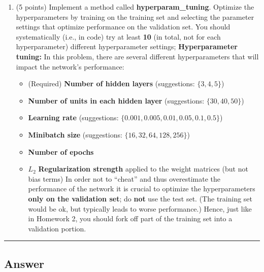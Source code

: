 \documentclass[
  letterpaper,
  DIV=11,
  numbers=noendperiod]{scrartcl}
\providecommand{\tightlist}{%
  \setlength{\itemsep}{0pt}\setlength{\parskip}{0pt}}\usepackage{longtable,booktabs,array}
\begin{document}
\begin{enumerate}
\def\labelenumi{\arabic{enumi}.}
\setcounter{enumi}{1}
\item
  (5 points) Implement a method called \textbf{hyperparam\_tuning}.
  Optimize the hyperparameters by training on the training set and
  selecting the parameter settings that optimize performance on the
  validation set. You should systematically (i.e., in code) try at least
  \textbf{10} (in total, not for each hyperparameter) different
  hyperparameter settings; \textbf{Hyperparameter tuning:} In this
  problem, there are several different hyperparameters that will impact
  the network's performance:

  \begin{itemize}
  \tightlist
  \item
    (Required) \textbf{Number of hidden layers} (suggestions:
    \(\{3,4,5\}\))
  \item
    \textbf{Number of units in each hidden layer} (suggestions:
    \(\{30,40,50\}\))
  \item
    \textbf{Learning rate} (suggestions:
    \(\{0.001, 0.005, 0.01, 0.05, 0.1, 0.5\}\))
  \item
    \textbf{Minibatch size} (suggestions: \(\{16,32, 64, 128, 256\}\))
  \item
    \textbf{Number of epochs}
  \item
    \(L_{2}\) \textbf{Regularization strength} applied to the weight
    matrices (but not bias terms) In order not to ``cheat'' and thus
    overestimate the performance of the network it is crucial to
    optimize the hyperparameters \textbf{only on the validation set}; do
    \textbf{not} use the test set. (The training set would be ok, but
    typically leads to worse performance.) Hence, just like in Homework
    2, you should fork off part of the training set into a validation
    portion.
  \end{itemize}
\end{enumerate}

\begin{center}\rule{0.5\linewidth}{0.5pt}\end{center}

\subsection{Answer}\label{answer-4}
\end{document}
